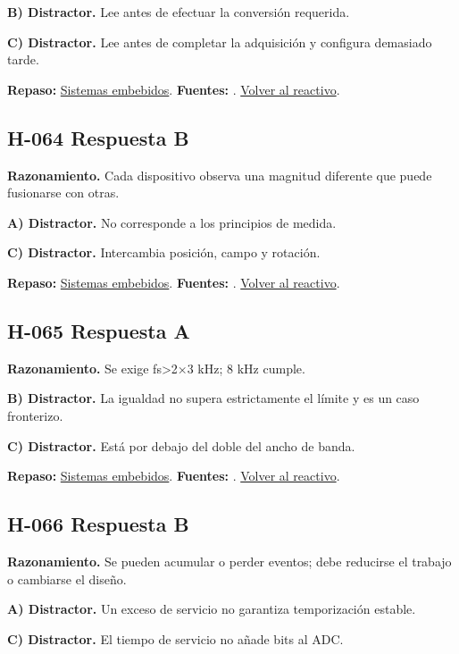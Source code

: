 \textbf{B) Distractor. }Lee antes de efectuar la conversión requerida.

\textbf{C) Distractor. }Lee antes de completar la adquisición y configura demasiado tarde.

\textbf{Repaso:} \hyperref[sec:h3]{Sistemas embebidos}. \textbf{Fuentes:} \cite{avr,arduino,sensors}. \hyperref[q:H-063]{Volver al reactivo}.\par\medskip

\subsection*{H-064 \quad Respuesta B}\label{s:H-064}
\textbf{Razonamiento.} Cada dispositivo observa una magnitud diferente que puede fusionarse con otras.

\textbf{A) Distractor. }No corresponde a los principios de medida.

\textbf{C) Distractor. }Intercambia posición, campo y rotación.

\textbf{Repaso:} \hyperref[sec:h3]{Sistemas embebidos}. \textbf{Fuentes:} \cite{avr,arduino,sensors}. \hyperref[q:H-064]{Volver al reactivo}.\par\medskip

\subsection*{H-065 \quad Respuesta A}\label{s:H-065}
\textbf{Razonamiento.} Se exige fs>2×3 kHz; 8 kHz cumple.

\textbf{B) Distractor. }La igualdad no supera estrictamente el límite y es un caso fronterizo.

\textbf{C) Distractor. }Está por debajo del doble del ancho de banda.

\textbf{Repaso:} \hyperref[sec:h3]{Sistemas embebidos}. \textbf{Fuentes:} \cite{avr,arduino,sensors}. \hyperref[q:H-065]{Volver al reactivo}.\par\medskip

\subsection*{H-066 \quad Respuesta B}\label{s:H-066}
\textbf{Razonamiento.} Se pueden acumular o perder eventos; debe reducirse el trabajo o cambiarse el diseño.

\textbf{A) Distractor. }Un exceso de servicio no garantiza temporización estable.

\textbf{C) Distractor. }El tiempo de servicio no añade bits al ADC.

